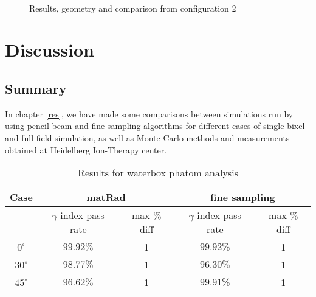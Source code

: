 \documentclass[12pt, a4paper, twoside]{book}
\begin{document}
\newpage
\begin{figure}[h!]
\centering
{} \quad
{} \\
 \quad
\caption{Results, geometry and comparison from configuration 2}
\label{fig:pos2}
\end{figure}


\chapter{Discussion} %

\section{Summary}
In chapter \ref{res}, we have made some comparisons between simulations run by using pencil beam and fine sampling algorithms for different cases of single bixel and full field simulation, as well as Monte Carlo methods and measurements obtained at Heidelberg Ion-Therapy center.
\begin{table}[b]
\centering
\begin{tabular}{ccccc}
\toprule
Case & \multicolumn{2}{c}{matRad} & \multicolumn{2}{c}{fine sampling}\\
\midrule
 & $\gamma$-index pass rate & max $\%$ diff & $\gamma$-index pass rate & max $\%$ diff\\
\midrule
$0^\circ$ & $99.92\%$ & 1 & $99.92\%$ &1\\
$30^\circ$ & $98.77\%$ & 1 & $96.30\%$ &1\\
$45^\circ$ & $96.62\%$ & 1 & $99.91\%$ &1\\
\bottomrule
\end{tabular}
\label{tab:hom}
\caption{Results for waterbox phatom analysis}
\end{table}
\end{document}
